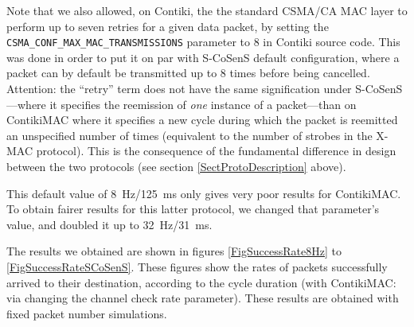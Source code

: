 \documentclass[conference]{IEEEtran}
\begin{document}
Note that we also allowed, on Contiki, the the standard CSMA/CA MAC layer
to perform up to seven retries for a given data packet, by setting the
\texttt{CSMA\_CONF\_MAX\_MAC\_TRANSMISSIONS}
parameter to 8 in Contiki source code. This was done in order to put it
on par with S-CoSenS default configuration, where a packet can by default
be transmitted up to 8 times before being cancelled.
Attention: the ``retry'' term does not have the same signification
under S-CoSenS---where it specifies the reemission of \emph{one} instance of
a packet---than on ContikiMAC where it specifies a new cycle during
which the packet is reemitted an unspecified number of times (equivalent
to the number of strobes in the X-MAC protocol). This is the consequence
of the fundamental difference in design between the two protocols
(see section \ref{SectProtoDescription} above).

This default value of 8~Hz/125~ms only gives very poor results for ContikiMAC.
To obtain fairer results for this latter protocol, we changed that
parameter's value, and doubled it up to 32~Hz/31~ms.

The results we obtained are shown in figures \ref{FigSuccessRate8Hz} to
\ref{FigSuccessRateSCoSenS}. These figures show the rates of packets
successfully arrived to their destination, according to the cycle
duration (with ContikiMAC: via changing the channel check rate parameter).
These results are obtained with fixed packet number simulations.
\end{document}
